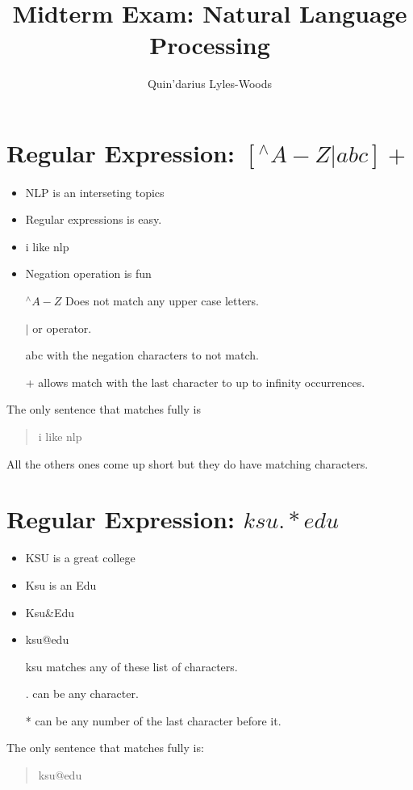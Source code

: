 \documentclass{article}
\title{Midterm Exam: Natural Language Processing}
\author{Quin'darius Lyles-Woods}
\begin{document}
\maketitle

\section{Regular Expression: \([^\wedge A-Z|abc]+\) }
\begin{itemize}
	\item NLP is an interseting topics
	\item Regular expressions is easy.
	\item i like nlp
	\item Negation operation is fun
\end{itemize}
\begin{itemize}
	\item [\(^\wedge A-Z\)] Does not match any upper case letters.
	\item [\(|\)] or operator.
	\item [abc] with the negation characters to not match.
	\item [+] allows match with the last character to up to infinity occurrences.
\end{itemize}
The only sentence that matches fully is 
\begin{quote}
	i like nlp
\end{quote}
All the others ones come up short but they do have matching characters.
\section{Regular Expression: \(ksu.*edu\)}
\begin{itemize}
	\item KSU is a great college
	\item Ksu is an Edu
	\item Ksu\&Edu
	\item ksu@edu
\end{itemize}
\begin{itemize}
	\item 	[ksu] matches any of these list of characters.
	\item 	[.] can be any character.
	\item 	[*] can be any number of the last character before it.
\end{itemize}
The only sentence that matches fully is: 
\begin{quote}
	ksu@edu
\end{quote}
\end{document}
